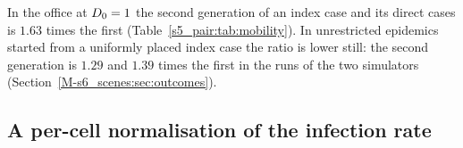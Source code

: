 In the office at $D_0=1$ the second generation of an index case and its direct cases is $1.63$ times the first
(Table~\ref{s5_pair:tab:mobility}). In unrestricted epidemics started from a uniformly placed index case the ratio is
lower still: the second generation is $1.29$ and $1.39$ times the first in the runs of the two simulators
(Section~\ref{M-s6_scenes:sec:outcomes}).

\subsection{A per-cell normalisation of the infection rate}\label{s5_pair:sec:percell}

